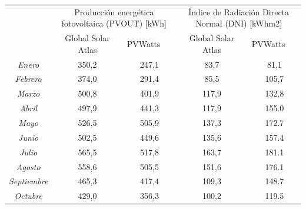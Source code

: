 \begin{table}
    \centering 
    \begin{tabularx}{\textheight}{|c|XX|XX|}
        \hline
        \rowcolor[HTML]{EFEFEF} 
        \cellcolor[HTML]{C0C0C0} & \multicolumn{2}{c|}{\cellcolor[HTML]{C0C0C0}Producción energética fotovoltaica (PVOUT) [kWh]} & \multicolumn{2}{c|}{\cellcolor[HTML]{C0C0C0}Índice de Radiación Directa Normal (DNI) [kWhm2]} \\ \cline{2-5} 
        \rowcolor[HTML]{C0C0C0} 
        \multirow{-2}{*}{\cellcolor[HTML]{C0C0C0}Mes} & \multicolumn{1}{c|}{\cellcolor[HTML]{C0C0C0}Global Solar Atlas} & PVWatts & \multicolumn{1}{c|}{\cellcolor[HTML]{C0C0C0}Global Solar Atlas} & PVWatts \\ \hline
        \textit{Enero} & \multicolumn{1}{c|}{350,2} & \multicolumn{1}{c|}{247,1} & \multicolumn{1}{c|}{83,7} & \multicolumn{1}{c|}{81,1} \\ \hline
        \textit{Febrero} & \multicolumn{1}{c|}{374,0} & \multicolumn{1}{c|}{291,4} & \multicolumn{1}{c|}{85,5} & \multicolumn{1}{c|}{105,7} \\ \hline
        \textit{Marzo} & \multicolumn{1}{c|}{500,8} & \multicolumn{1}{c|}{401,9} & \multicolumn{1}{c|}{117,9} & \multicolumn{1}{c|}{132,8} \\ \hline
        \textit{Abril} & \multicolumn{1}{c|}{497,9} & \multicolumn{1}{c|}{441,3} & \multicolumn{1}{c|}{117,9} & \multicolumn{1}{c|}{155.0} \\ \hline
        \textit{Mayo} & \multicolumn{1}{c|}{526,5} & \multicolumn{1}{c|}{505,9} & \multicolumn{1}{c|}{137,3} & \multicolumn{1}{c|}{172.7} \\ \hline
        \textit{Junio} & \multicolumn{1}{c|}{502,5} & \multicolumn{1}{c|}{449,6} & \multicolumn{1}{c|}{135,6} & \multicolumn{1}{c|}{157.4} \\ \hline
        \textit{Julio} & \multicolumn{1}{c|}{565,5} & \multicolumn{1}{c|}{517,8} & \multicolumn{1}{c|}{163,7} & \multicolumn{1}{c|}{181.1} \\ \hline
        \textit{Agosto} & \multicolumn{1}{c|}{558,6} & \multicolumn{1}{c|}{505,5} & \multicolumn{1}{c|}{151,6} & \multicolumn{1}{c|}{176.1} \\ \hline
        \textit{Septiembre} & \multicolumn{1}{c|}{465,3} & \multicolumn{1}{c|}{417,4} & \multicolumn{1}{c|}{109,3} & \multicolumn{1}{c|}{148.7} \\ \hline
        \textit{Octubre} & \multicolumn{1}{c|}{429,0} & \multicolumn{1}{c|}{356,3} & \multicolumn{1}{c|}{100,2} & \multicolumn{1}{c|}{119.5} \\ \hline

\end{tabularx}
\end{table}
